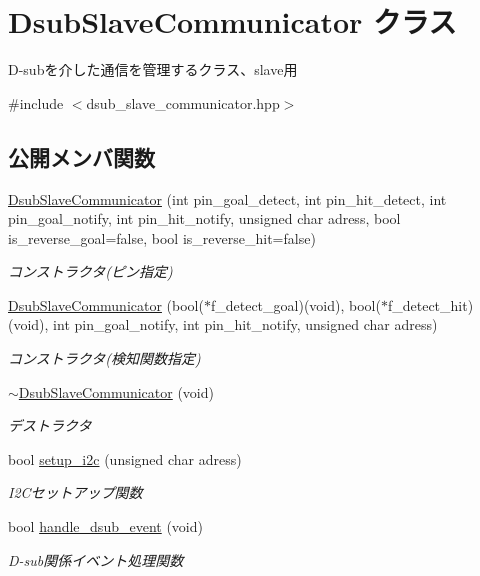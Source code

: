 \hypertarget{class_dsub_slave_communicator}{}\section{Dsub\+Slave\+Communicator クラス}
\label{class_dsub_slave_communicator}


D-\/subを介した通信を管理するクラス、slave用  




{\ttfamily \#include $<$dsub\+\_\+slave\+\_\+communicator.\+hpp$>$}

\subsection*{公開メンバ関数}
\begin{DoxyCompactItemize}
\item 
\mbox{\hyperlink{class_dsub_slave_communicator_a5d5d26f4fa61073bf85c01aa859f4f2e}{Dsub\+Slave\+Communicator}} (int pin\+\_\+goal\+\_\+detect, int pin\+\_\+hit\+\_\+detect, int pin\+\_\+goal\+\_\+notify, int pin\+\_\+hit\+\_\+notify, unsigned char adress, bool is\+\_\+reverse\+\_\+goal=false, bool is\+\_\+reverse\+\_\+hit=false)
\begin{DoxyCompactList}\small\item\em コンストラクタ(ピン指定) \end{DoxyCompactList}\item 
\mbox{\hyperlink{class_dsub_slave_communicator_a30697bf0229412f27e59a6f7c1b5843a}{Dsub\+Slave\+Communicator}} (bool($\ast$f\+\_\+detect\+\_\+goal)(void), bool($\ast$f\+\_\+detect\+\_\+hit)(void), int pin\+\_\+goal\+\_\+notify, int pin\+\_\+hit\+\_\+notify, unsigned char adress)
\begin{DoxyCompactList}\small\item\em コンストラクタ(検知関数指定) \end{DoxyCompactList}\item 
\mbox{\hyperlink{class_dsub_slave_communicator_af3369086cde883a07f686203a41aab13}{$\sim$\+Dsub\+Slave\+Communicator}} (void)
\begin{DoxyCompactList}\small\item\em デストラクタ \end{DoxyCompactList}\item 
bool \mbox{\hyperlink{class_dsub_slave_communicator_a38614c9732f810200a8429dd4bac88aa}{setup\+\_\+i2c}} (unsigned char adress)
\begin{DoxyCompactList}\small\item\em I2\+Cセットアップ関数 \end{DoxyCompactList}\item 
bool \mbox{\hyperlink{class_dsub_slave_communicator_aef578741915e2e109b7b4d7813693cfe}{handle\+\_\+dsub\+\_\+event}} (void)
\begin{DoxyCompactList}\small\item\em D-\/sub関係イベント処理関数 \end{DoxyCompactList}\end{DoxyCompactItemize}
